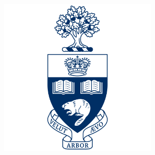 \documentclass[landscape,a0b,final,a4resizeable]{include/a0poster}
\begin{document}
\begin{poster}
\begin{multicols}{3}
\begin{center}
\begin{minipage}[c]{0.2\columnwidth}
  \captionsetup{labelformat=empty}
\end{minipage}
\begin{minipage}[c]{0.2\columnwidth}
  \includegraphics[width=8cm]{badges/toronto}
  \captionsetup{labelformat=empty}
\end{minipage}
\end{center}
 
%
 

\end{multicols}
\end{poster}
\end{document}
